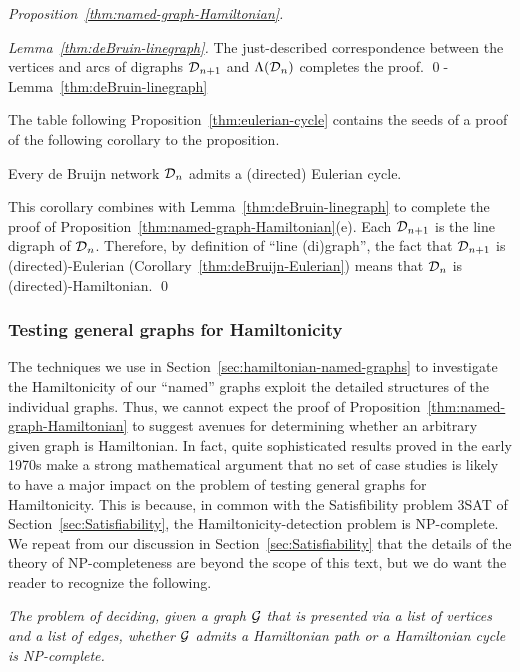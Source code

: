 \begin{proof}[Proposition~\ref{thm:named-graph-Hamiltonian}]
\begin{proof}[Lemma~\ref{thm:deBruin-linegraph}]
\smallskip

The just-described correspondence between the vertices and arcs of digraphs $\mbox{$\cal D$}_{n+1}$ and $\Lambda(\mbox{$\cal D$}_n)$ completes the proof.  \qed-Lemma~\ref{thm:deBruin-linegraph}
\end{proof}

\medskip

  

The table following Proposition~\ref{thm:eulerian-cycle} contains the seeds of a proof of the following corollary to the proposition.

\begin{corol}
\label{thm:deBruijn-Eulerian}
Every de Bruijn network $\mbox{$\cal D$}_n$ admits a (directed) Eulerian cycle.
\end{corol}

This corollary combines with Lemma~\ref{thm:deBruin-linegraph} to complete the proof of 
Proposition~\ref{thm:named-graph-Hamiltonian}(e).  Each $\mbox{$\cal D$}_{n+1}$ is the line digraph of  $\mbox{$\cal D$}_n$.  Therefore, by definition of  ``line (di)graph'', the fact that $\mbox{$\cal D$}_{n+1}$ is (directed)-Eulerian
(Corollary~\ref{thm:deBruijn-Eulerian}) means that $\mbox{$\cal D$}_n$ is (directed)-Hamiltonian.  \qed
\end{proof}


\subsubsection{Testing general graphs for Hamiltonicity}
\label{sec:Hamiltonian-unweighted}

The techniques we use in Section~\ref{sec:hamiltonian-named-graphs} to investigate the Hamiltonicity of our ``named'' graphs exploit the detailed structures of the individual graphs.  Thus, we cannot expect the proof of Proposition~\ref{thm:named-graph-Hamiltonian} to suggest avenues for determining whether an arbitrary given graph is Hamiltonian.  In fact, quite sophisticated results proved in the early 1970s make a strong mathematical argument that no set of case studies is likely to have a major impact on the problem of testing general graphs for Hamiltonicity.  This is because, in common with the Satisfibility problem {\sf 3SAT} of Section~\ref{sec:Satisfiability}, the Hamiltonicity-detection problem is {\sf NP}-complete.  We repeat from our discussion in Section~\ref{sec:Satisfiability} that the details of the theory of {\sf NP}-completeness are beyond the scope of this text, but we do want the reader to recognize the following.
\begin{description}
\item
{\it The problem of deciding, given a graph $\mbox{$\cal G$}$ that is presented via a list of vertices and a list of edges, whether $\mbox{$\cal G$}$ admits a Hamiltonian path or a Hamiltonian cycle is {\sf NP}-complete.}
\end{description}



